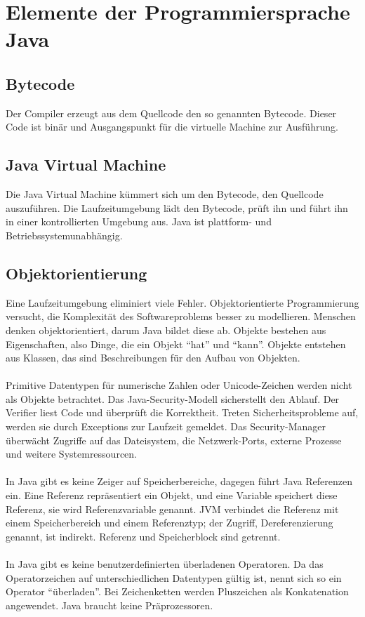 \section{Elemente der Programmiersprache Java}
\subsection{Bytecode}
Der Compiler erzeugt aus dem Quellcode den so genannten Bytecode. Dieser Code ist binär und Ausgangspunkt für die virtuelle Machine zur Ausführung. 
\subsection{Java Virtual Machine}
Die Java Virtual Machine kümmert sich um den Bytecode, den Quellcode auszuführen. Die Laufzeitumgebung lädt den Bytecode, prüft ihn und führt ihn in einer kontrollierten Umgebung aus. Java ist plattform- und Betriebssystemunabhängig. 
\subsection{Objektorientierung}
Eine Laufzeitumgebung eliminiert viele Fehler. Objektorientierte Programmierung versucht, die Komplexität des Softwareproblems besser zu modellieren. Menschen denken objektorientiert, darum Java bildet diese ab. Objekte bestehen aus Eigenschaften, also Dinge, die ein Objekt ``hat'' und ``kann''. Objekte entstehen aus Klassen, das sind Beschreibungen für den Aufbau von Objekten. 
\\\\
Primitive Datentypen für numerische Zahlen oder Unicode-Zeichen werden nicht als Objekte betrachtet. Das Java-Security-Modell sicherstellt den Ablauf. Der Verifier liest Code und überprüft die Korrektheit. Treten Sicherheitsprobleme auf, werden sie durch Exceptions zur Laufzeit gemeldet. Das Security-Manager überwächt Zugriffe auf das Dateisystem, die Netzwerk-Ports, externe Prozesse und weitere Systemressourcen.
\\\\
In Java gibt es keine Zeiger auf Speicherbereiche, dagegen führt Java Referenzen ein. Eine Referenz repräsentiert ein Objekt, und eine Variable speichert diese Referenz, sie wird Referenzvariable genannt. JVM verbindet die Referenz mit einem Speicherbereich und einem Referenztyp; der Zugriff, Dereferenzierung genannt, ist indirekt. Referenz und Speicherblock sind getrennt. 
\\\\
In Java gibt es keine benutzerdefinierten überladenen Operatoren. Da das Operatorzeichen auf unterschiedlichen Datentypen gültig ist, nennt sich so ein Operator ``überladen''. Bei Zeichenketten werden Pluszeichen als Konkatenation angewendet. Java braucht keine Präprozessoren.
